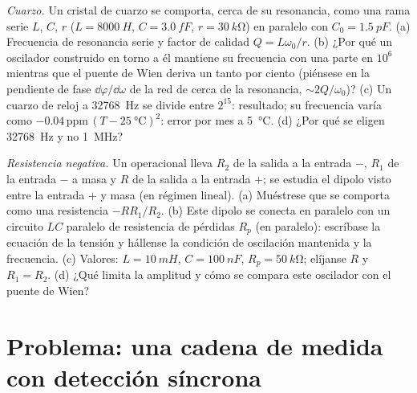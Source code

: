 \begin{exercise}[$\star\star\star$]\label{exo:b2:feedback-oscillators:11}
\emph{Cuarzo.} Un cristal de cuarzo se comporta, cerca de su resonancia,
como una rama serie $L$, $C$, $r$ ($L = \qty{8000}{H}$, $C = \qty{3.0}{fF}$, $r =
\qty{30}{k\ohm}$) en paralelo con $C_0 = \qty{1.5}{pF}$. (a) Frecuencia de
resonancia serie y factor de calidad $Q = L\omega_0/r$. (b) ¿Por qué un
oscilador construido en torno a él mantiene su frecuencia con una parte en $10^6$ mientras que el puente
de Wien deriva un tanto por ciento (piénsese en la pendiente de fase $\dd\varphi/\dd\omega$ de
la red de  cerca de la resonancia, $\sim 2Q/\omega_0$)? (c) Un cuarzo
de reloj a \qty{32768}{Hz} se divide entre $2^{15}$: resultado; su frecuencia
varía como $-0.04\,\text{ppm}\,(T - \qty{25}{\degreeCelsius})^2$: error por
mes a \qty{5}{\degreeCelsius}. (d) ¿Por qué se eligen \qty{32768}{Hz} y no
\qty{1}{MHz}?
\end{exercise}

\begin{exercise}[$\star\star\star$]\label{exo:b2:feedback-oscillators:12}
\emph{Resistencia negativa.} Un operacional lleva $R_2$ de la salida a la
entrada $-$, $R_1$ de la entrada $-$ a masa y $R$ de la salida a la
entrada $+$; se estudia el dipolo visto entre la entrada $+$ y masa (en
régimen lineal). (a) Muéstrese que se comporta como una resistencia
$-RR_1/R_2$. (b) Este dipolo se conecta en paralelo con un circuito $LC$
paralelo de resistencia de pérdidas $R_p$ (en paralelo): escríbase la
ecuación de la tensión y hállense la condición de oscilación mantenida y
la frecuencia. (c) Valores: $L
= \qty{10}{mH}$, $C = \qty{100}{nF}$, $R_p = \qty{50}{k\ohm}$; elíjanse $R$ y $R_1 =
R_2$. (d) ¿Qué limita la amplitud y cómo se compara este oscilador con el
puente de Wien?
\end{exercise}

\section{Problema: una cadena de medida con detección síncrona}

